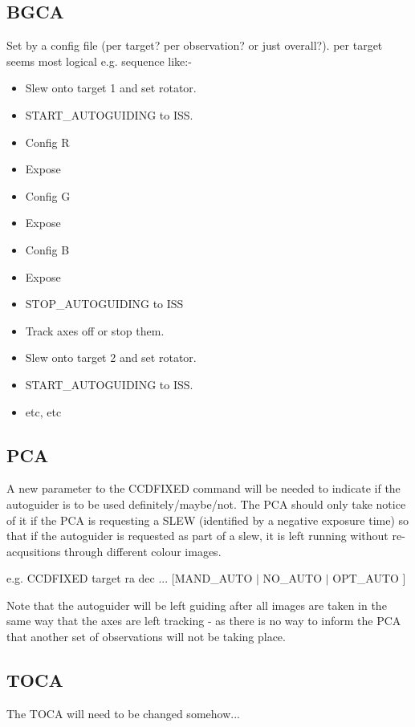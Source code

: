 \documentclass{article}
\begin{document}
\subsection{BGCA}

Set by a config file (per target?  per observation? or just
overall?). per target seems most logical e.g. sequence like:-

\begin{itemize}
\item Slew onto target 1 and set rotator.
\item START\_AUTOGUIDING to ISS.
\item Config R
\item Expose
\item Config G
\item Expose
\item Config B
\item Expose
\item STOP\_AUTOGUIDING to ISS
\item Track axes off or stop them.
\item Slew onto target 2 and set rotator.
\item START\_AUTOGUIDING to ISS.
\item etc, etc
\end{itemize}


\subsection{PCA}

A new parameter to the CCDFIXED command will be needed
to indicate if the autoguider is to be used definitely/maybe/not.
The PCA should only take notice of it if the PCA is
requesting a SLEW (identified by a negative exposure time)
so that if the autoguider is requested as part of a slew,
it is left running without re-acqusitions through
different colour images.

e.g. CCDFIXED target ra dec ... [MAND\_AUTO $|$ NO\_AUTO $|$ OPT\_AUTO ] 

Note that the autoguider will be left guiding after all images are taken in the same way
that the axes are left tracking - as there is no way to inform the PCA that another set
of observations will not be taking place. 

\subsection{TOCA}

The TOCA will need to be changed somehow...
\end{document}
